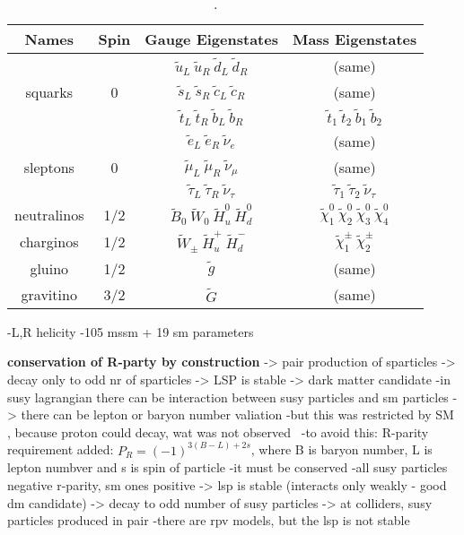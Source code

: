 \begin{table}[h]
\begin{center}
\begin{tabular}{|c|c|c|c|}
\hline
Names & Spin  & Gauge Eigenstates & Mass Eigenstates  \\
\hline
        &   & $\tilde{u}_{L}~\tilde{u}_{R}~\tilde{d}_{L}~\tilde{d}_{R}$  & (same) \\
squarks & 0 & $\tilde{s}_{L}~\tilde{s}_{R}~\tilde{c}_{L}~\tilde{c}_{R}$  & (same) \\
        &   & $\tilde{t}_{L}~\tilde{t}_{R}~\tilde{b}_{L}~\tilde{b}_{R}$  & $\tilde{t}_{1}~\tilde{t}_{2}~\tilde{b}_{1}~\tilde{b}_{2}$ \\
\hline
         &   & $\tilde{e}_{L}~\tilde{e}_{R}~\tilde{\nu}_{e}$  & (same) \\
sleptons & 0 & $\tilde{\mu}_{L}~\tilde{\mu}_{R}~\tilde{\nu}_{\mu}$  & (same) \\
         &   & $\tilde{\tau}_{L}~\tilde{\tau}_{R}~\tilde{\nu}_{\tau}$  & $\tilde{\tau}_{1}~\tilde{\tau}_{2}~\tilde{\nu}_{\tau}$ \\
\hline
neutralinos & 1/2 & $\tilde{B}_{0}~\tilde{W}_{0}~\tilde{H}_{u}^{0}~\tilde{H}_{d}^{0}$  & $\tilde{\chi}_{1}^{0}~\tilde{\chi}_{2}^{0}~\tilde{\chi}_{3}^{0}~\tilde{\chi}_{4}^{0} $ \\
\hline
charginos & 1/2 & $\tilde{W}_{\pm}~\tilde{H}_{u}^{+}~\tilde{H}_{d}^{-}$  & $\tilde{\chi}_{1}^{\pm}~\tilde{\chi}_{2}^{\pm} $ \\
\hline
gluino & 1/2 & $\tilde{g}$  & (same) \\
\hline
gravitino & 3/2 & $\tilde{G}$  & (same) \\
\hline
\end{tabular}
\caption[Table caption text]{\cite{Martin:1997ns}. }
\label{tab:SUSYspectrum}
\end{center}
\end{table}

-L,R helicity
-105 mssm + 19 sm parameters

\textbf{conservation of R-party by construction }
	-> pair production of sparticles
        -> decay only to odd nr of sparticles
        -> LSP is stable -> dark matter candidate
-in susy lagrangian there can be interaction between susy particles and sm particles -> there can be lepton or baryon number valiation
-but this was restricted by SM , because proton could decay, wat was not observed~\cite{Nishino:2009aa}
-to avoid this: R-parity requirement added:  $P_R=(-1)^{3(B-L)+2s } $, where B is baryon number, L is lepton numbver and s is spin of particle
-it must be conserved
-all susy particles negative r-parity, sm ones positive
	-> lsp is stable (interacts only weakly - good dm candidate)
	-> decay to odd number of susy particles
	-> at colliders, susy particles produced in pair
-there are rpv models, but the lsp is not stable

